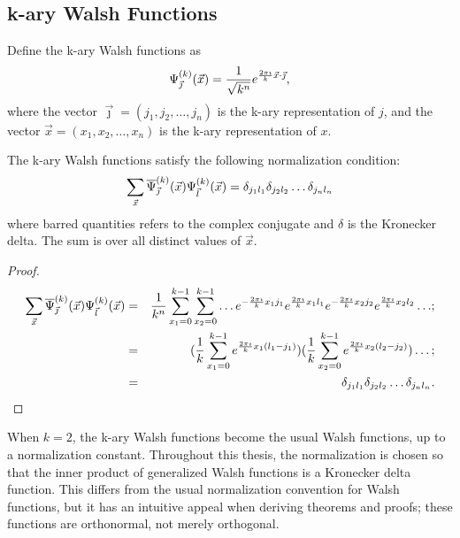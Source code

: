 \subsection{k-ary Walsh Functions}
\begin{definition}
Define the k-ary Walsh functions as
\begin{equation}
\mbox{$\Psi_{\vec{\jmath}}^{(k)}(\vec{x})$} = {\frac{1}{\sqrt{k^n}}
	e^{\frac{2 \pi \imath}{k} \vec x \cdot\vec \jmath }},
	\label{karywalshfunction}
\end{equation}
where the vector $\vec \jmath =(j_1,j_2,\ldots,j_n)$ is the k-ary representation
of $j$, and the vector $\vec x =(x_1,x_2,\ldots,x_n)$ is the k-ary 
representation of $x$.
\end{definition}
\begin{theorem}
The k-ary Walsh functions satisfy the following normalization condition:
\begin{equation}
\sum_{\vec x}{\mbox{$\overline{\Psi}_{\vec{\jmath}}^{(k)}(\vec{x})$}
	\Psi^{(k)}_{\vec l}(\vec x)}=
	\delta_{j_1 l_1} \delta_{j_2 l_2} \ldots \delta_{j_n l_n}
\end{equation}
where barred quantities refers to the complex conjugate and $\delta$ is the
Kronecker delta.  The sum is over all distinct values of $\vec x$.
\end{theorem}
\begin{proof}
\begin{eqnarray}
\sum_{\vec x}{\mbox{$\overline{\Psi}_{\vec{\jmath}}^{(k)}(\vec{x})$}
	\Psi^{(k)}_{\vec l}(\vec x)} 
	&= &\frac{1}{k^n}\sum_{x_1=0}^{k-1}{\sum_{x_2=0}^{k-1}{\ldots
		e^{- \frac{2 \pi \imath}{k} x_1 j_1}
		e^{\frac{2 \pi \imath}{k} x_1 l_1}
		e^{- \frac{2 \pi \imath}{k} x_2 j_2}
		e^{\frac{2 \pi \imath}{k} x_2 l_2}
		\ldots
		}} ;\nonumber \\
	&= & (\frac{1}{k}\sum_{x_1=0}^{k-1}
		{e^{\frac{2 \pi \imath}{k} x_1 (l_1-j_1)}})
	     (\frac{1}{k}\sum_{x_2=0}^{k-1}
		{e^{\frac{2 \pi \imath}{k} x_2 (l_2-j_2)}})
		\ldots ;\nonumber \\
	&=& \delta_{j_1 l_1} \delta_{j_2 l_2} \ldots \delta_{j_n l_n}.
\end{eqnarray}
\end{proof}
When $k=2$, the k-ary Walsh functions become the usual Walsh functions,
up to a normalization constant.  Throughout this thesis, the normalization
is chosen so that the inner product of generalized Walsh functions is
a Kronecker delta function.  This differs from the usual normalization
convention for Walsh functions, but it has an intuitive appeal when deriving
theorems and proofs; these functions are orthonormal, not merely
orthogonal.

